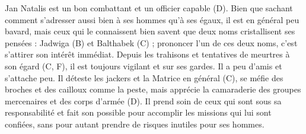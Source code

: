{		Jan Natalis est un bon combattant et un officier capable (D). Bien que sachant comment s'adresser aussi bien à ses hommes qu'à ses égaux, il est en général peu bavard, mais ceux qui le connaissent bien savent que deux noms cristallisent ses pensées : Jadwiga (B) et Balthabek (C) ; prononcer l'un de ces deux noms, c'est s'attirer son intérêt immédiat. Depuis les trahisons et tentatives de meurtres à son égard (C, F), il est toujours vigilant et sur ses gardes. Il a peu d'amis et s'attache peu. Il déteste les jackers et la Matrice en général (C), se méfie des broches et des cailloux comme la peste, mais apprécie la camaraderie des groupes mercenaires et des corps d'armée (D). Il prend soin de ceux qui sont sous sa responsabilité et fait son possible pour accomplir les missions qui lui sont confiées, sans pour autant prendre de risques inutiles pour ses hommes.
}%


